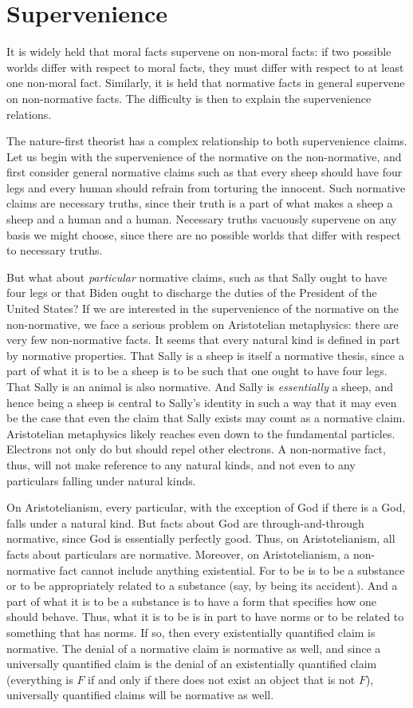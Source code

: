 \section{Supervenience}
It is widely held that moral facts supervene on non-moral facts: if two possible worlds differ
with respect to moral facts, they must differ with respect to at least one non-moral fact. Similarly,
it is held that normative facts in general supervene on non-normative facts. The difficulty is then
to explain the supervenience relations.

The nature-first theorist has a complex relationship to both supervenience claims. Let us begin
with the supervenience of the normative on the non-normative, and first consider
general normative claims such as that every sheep should have four legs and every human should refrain
from torturing the innocent. Such normative claims are necessary truths, since their truth is a part of
what makes a sheep a sheep and a human and a human. Necessary truths vacuously supervene on any basis
we might choose, since there are no possible worlds that differ with respect to necessary truths.

But what about \textit{particular} normative claims, such as that Sally ought to have four legs
or that Biden ought to discharge the duties of the President of the United States? If we are
interested in the supervenience of the normative on the non-normative, we face a serious problem on
Aristotelian metaphysics: there are very few non-normative facts. It seems that every natural kind
is defined in part by normative properties. That Sally is a sheep is itself a normative thesis,
since a part of what it is to be a sheep is to be such that one ought to have four legs. That Sally
is an animal is also normative. And Sally is \textit{essentially} a sheep, and hence being a sheep
is central to Sally's identity in such a way that it may even be the case that even the claim that
Sally exists may count as a normative claim. Aristotelian metaphysics likely reaches even down to the fundamental
particles. Electrons not only do but should repel other electrons. A non-normative fact, thus, will
not make reference to any natural kinds, and not even to any particulars falling under natural
kinds.

On Aristotelianism, every particular, with the exception of God if there is a God, falls under a natural kind.
But facts about God are through-and-through normative, since God is essentially perfectly good. Thus,
on Aristotelianism, all facts about particulars are normative. 
Moreover, on Aristotelianism, a non-normative fact cannot include anything existential.
For to be is to be a substance or to be appropriately related to a substance (say, by being its accident).
And a part of what it is to be a substance is to have a form that specifies how one should behave. Thus,
what it is to be is in part to have norms or to be related to something that has norms. If so, then every
existentially quantified claim is normative. The denial of a normative claim is normative as well, and
since a universally quantified claim is the denial of an existentially quantified claim (everything is
$F$ if and only if there does not exist an object that is not $F$), universally quantified claims 
will be normative as well. 

